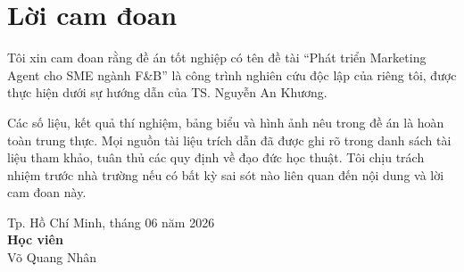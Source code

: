 \cleardoublepage
{}
{}
\chapter*{Lời cam đoan}

Tôi xin cam đoan rằng đề án tốt nghiệp có tên đề tài ``Phát triển Marketing Agent cho SME ngành F\&B'' là công trình nghiên cứu độc lập của riêng tôi, được thực hiện dưới sự hướng dẫn của TS. Nguyễn An Khương.

Các số liệu, kết quả thí nghiệm, bảng biểu và hình ảnh nêu trong đề án là hoàn toàn trung thực. Mọi nguồn tài liệu trích dẫn đã được ghi rõ trong danh sách tài liệu tham khảo, tuân thủ các quy định về đạo đức học thuật. Tôi chịu trách nhiệm trước nhà trường nếu có bất kỳ sai sót nào liên quan đến nội dung và lời cam đoan này.

\vspace{2em}

\begin{flushright}
\begin{minipage}{0.5\textwidth}
\centering
Tp. Hồ Chí Minh, tháng 06 năm 2026\\[0.5em]
\textbf{Học viên}\\[10em]
Võ Quang Nhân
\end{minipage}
\end{flushright}
